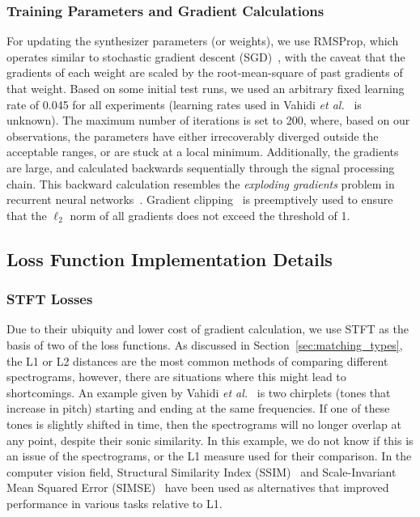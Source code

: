 \documentclass[lettersize,journal]{IEEEtran}
\begin{document}
\subsubsection{Training Parameters and Gradient Calculations}
 For updating the synthesizer parameters (or weights), we use RMSProp, which operates similar to stochastic gradient descent (SGD)~\cite{goodfellow2016deep}, with the caveat that the gradients of each weight are scaled by the root-mean-square of past gradients of that weight. Based on some initial test runs, we used an arbitrary fixed learning rate of 0.045 for all experiments (learning rates used in Vahidi \textit{et al.}~\cite{vahidi2023mesostructures} is unknown). The maximum number of iterations is set to 200, where, based on our observations, the parameters have either irrecoverably diverged outside the acceptable ranges, or are stuck at a local minimum. Additionally, the gradients are large, and calculated backwards sequentially through the signal processing chain. This backward calculation resembles the \textit{exploding gradients} problem in recurrent neural networks~\cite{gers2000learning}. Gradient clipping~\cite{goodfellow2016deep} is preemptively used to ensure that the  $\ell_2$ norm of all gradients does not exceed the threshold of 1. 


\subsection{Loss Function Implementation Details}
\label{sec:loss_implementation}
\subsubsection{STFT Losses}
Due to their ubiquity and lower cost of gradient calculation, we use STFT as the basis of two of the loss functions. As discussed in Section~\ref{sec:matching_types}, the L1 or L2 distances are the most common methods of comparing different spectrograms, however, there are situations where this might lead to shortcomings. An example given by Vahidi \textit{et al.}~\cite{vahidi2023mesostructures} is two chirplets (tones that increase in pitch) starting and ending at the same frequencies. If one of these tones is slightly shifted in time, then the spectrograms will no longer overlap at any point, despite their sonic similarity. In this example, we do not know if this is an issue of the spectrograms, or the L1 measure used for their comparison. In the computer vision field, Structural Similarity Index (SSIM)~\cite{wang2004imagesssim,wang2009mean} and Scale-Invariant Mean Squared Error (SIMSE)~\cite{barron2014shapessimse} have been used as alternatives that improved performance in various tasks relative to L1.
\end{document}
